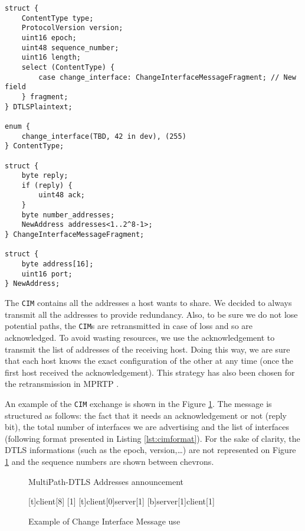 \begin{lstlisting}[caption=Change Interface Message, label=lst:cimformat]
struct {
    ContentType type;
    ProtocolVersion version;
    uint16 epoch;
    uint48 sequence_number;
    uint16 length;
    select (ContentType) {
        case change_interface: ChangeInterfaceMessageFragment; // New field
    } fragment;
} DTLSPlaintext;

enum {
    change_interface(TBD, 42 in dev), (255)
} ContentType;

struct {
    byte reply;
    if (reply) {
        uint48 ack;
    }
    byte number_addresses;
    NewAddress addresses<1..2^8-1>;
} ChangeInterfaceMessageFragment;

struct {
    byte address[16];
    uint16 port;
} NewAddress;
\end{lstlisting}

The \texttt{CIM} contains all the addresses a host wants to share. We decided to always transmit all the addresses to provide redundancy. Also, to be sure we do not lose potential paths, the \texttt{CIM}s are retransmitted in case of loss and so are acknowledged. To avoid wasting resources, we use the acknowledgement to transmit the list of addresses of the receiving host. Doing this way, we are sure that each host knows the exact configuration of the other at any time (once the first host received the acknowledgement). This strategy has also been chosen for the retransmission in MPRTP \cite{singh-avtcore-mprtp}.

An example of the \texttt{CIM} exchange is shown in the Figure \ref{fig:CIMexchange}. The message is structured as follows: the fact that it needs an acknowledgement or not (reply bit), the total number of interfaces we are advertising and the list of interfaces (following format presented in Listing \ref{lst:cimformat}). For the sake of clarity, the DTLS informations (such as the epoch, version,\dots) are not represented on Figure \ref{fig:CIMexchange} and the sequence numbers are shown between chevrons.

\begin{figure}[!ht]
\centering
\begin{msc}[r]{MultiPath-DTLS Addresses announcement}

\setlength{\instfootheight}{0em}
\setlength{\instheadheight}{0em}
\setlength{\instdist}{0.7\linewidth}
\setlength{\levelheight}{3em}


[t]{}{client}[8]
[1]
\nextlevel
{}[t]{client}[0]{server}[1]
\nextlevel
{}[b]{server}[1]{client}[1]
\nextlevel
\nextlevel

\end{msc}
\caption{Example of Change Interface Message use}
\label{fig:CIMexchange}
\end{figure}

